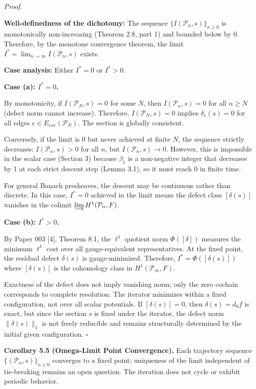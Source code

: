 \documentclass[
]{article}
\begin{document}
\emph{Proof.}

\textbf{Well-definedness of the dichotomy:} The sequence
\(\{I(\mathcal{P}_n, s)\}_{n \geq 0}\) is monotonically non-increasing
(Theorem 2.8, part 1) and bounded below by 0. Therefore, by the monotone
convergence theorem, the limit
\(I^* = \lim_{n \to \infty} I(\mathcal{P}_n, s)\) exists.

\textbf{Case analysis:} Either \(I^* = 0\) or \(I^* > 0\).

\textbf{Case (a): \(I^* = 0\).}

By monotonicity, if \(I(\mathcal{P}_N, s) = 0\) for some \(N\), then
\(I(\mathcal{P}_n, s) = 0\) for all \(n \geq N\) (defect norm cannot
increase). Therefore, \(I(\mathcal{P}_N, s) = 0\) implies
\(\delta_e(s) = 0\) for all edges
\(e \in E_{\text{cov}}(\mathcal{P}_N)\). The section is globally
consistent.

Conversely, if the limit is 0 but never achieved at finite \(N\), the
sequence strictly decreases: \(I(\mathcal{P}_n, s) > 0\) for all \(n\),
but \(I(\mathcal{P}_n, s) \to 0\). However, this is impossible in the
scalar case (Section 3) because \(\beta_1\) is a non-negative integer
that decreases by 1 at each strict descent step (Lemma 3.1), so it must
reach 0 in finite time.

For general Banach presheaves, the descent may be continuous rather than
discrete. In this case, \(I^* = 0\) achieved in the limit means the
defect class \([\delta(s)]\) vanishes in the colimit
\(\varinjlim H^1(\mathcal{P}_n, F)\).

\textbf{Case (b): \(I^* > 0\).}

By Paper 003 {[}4{]}, Theorem 8.1, the \(\ell^1\) quotient norm
\(\Phi([\delta])\) measures the minimum \(\ell^1\) cost over all
gauge-equivalent representatives. At the fixed point, the residual
defect \(\delta(s)\) is gauge-minimized. Therefore,
\(I^* = \Phi([\delta(s)])\) where \([\delta(s)]\) is the cohomology
class in \(H^1(\mathcal{P}_\infty, F)\).

Exactness of the defect does not imply vanishing norm; only the zero
cochain corresponds to complete resolution. The iterator minimizes
within a fixed configuration, not over all scalar potentials. If
\([\delta(s)] = 0\), then \(\delta(s) = d_0 f\) is exact, but since the
section \(s\) is fixed under the iterator, the defect norm
\(\|\delta(s)\|_1\) is not freely reducible and remains structurally
determined by the initial given configuration. \(\square\)

\textbf{Corollary 5.5 (Omega-Limit Point Convergence).} Each trajectory
sequence \(\{(\mathcal{P}_n, s)\}_{n \geq 0}\) converges to a fixed
point; uniqueness of the limit independent of tie-breaking remains an
open question. The iteration does not cycle or exhibit periodic
behavior.
\end{document}
